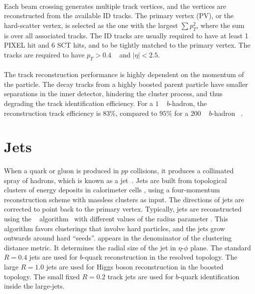 \paragraph{}
Each beam crossing generates multiple track vertices, and the vertices are reconstructed from the available ID tracks. 
The primary vertex (PV), or the hard-scatter vertex, is selected as the one with the largest $\sum p_T^2$, where the sum is over all associated tracks.
The ID tracks are usually required to have at least 1 PIXEL hit and 6 SCT hits, and to be tightly matched to the primary vertex.
The tracks are required to have $p_T > 0.4$ \GeV~ and $|\eta| < 2.5$.

\paragraph{}
The track reconstruction performance is highly dependent on the momentum of the particle. 
The decay tracks from a highly boosted parent particle have smaller separations in the inner detector, hindering the cluster process, and thus degrading the track identification efficiency. 
For a $1$ \TeV~ $b$-hadron, the reconstruction track efficiency is $83\%$, compared to $95\%$ for a $200$ \GeV~ $b$-hadron ~\cite{Aaboud:2017all}.

\section{Jets}
\paragraph{}
When a quark or gluon is produced in $pp$ collisions, it produces a collimated spray of hadrons, which is known as a jet~\cite{Salam:2009jx}.
Jets are built from topological clusters of energy deposits in calorimeter cells \cite{PERF-2014-07}, using a four-momentum reconstruction scheme with massless clusters as input. 
The directions of jets are corrected to point back to the primary vertex.
Typically, jets are reconstructed using the \akt~ algorithm~\cite{AntiKt} with different values of the radius parameter \R. 
This algorithm favors clusterings that involve hard particles, and the jets grow outwards around hard ``seeds''.
\R appears in the denominator of the clustering distance metric.
It determines the radial size of the jet in $\eta$-$\phi$ plane.
The standard $R=0.4$ jets are used for $b$-quark reconstruction in the resolved topology.
The large $R=1.0$ jets are used for Higgs boson reconstruction in the boosted topology.
The small fixed $R=0.2$ track jets are used for $b$-quark identification inside the large-\R jets.

